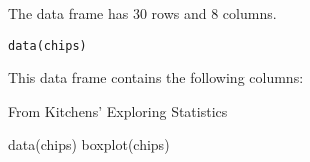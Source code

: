 \begin{Description}\relax
The  data frame has 30 rows and 8 columns.
\end{Description}
\begin{Usage}
\begin{verbatim}data(chips)\end{verbatim}
\end{Usage}
\begin{Format}\relax
This data frame contains the following columns:
\end{Format}
\begin{Details}\relax
\end{Details}
\begin{Source}\relax
From Kitchens' Exploring Statistics
\end{Source}
\begin{Examples}
\begin{ExampleCode}
data(chips)
boxplot(chips)
\end{ExampleCode}
\end{Examples}

